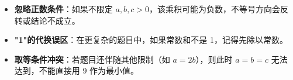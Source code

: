 \begin{trapbox}
\begin{itemize}
    \item \textbf{忽略正数条件}：如果不限定 $a,b,c > 0$，该乘积可能为负数，不等号方向会反转或结论不成立。
    \item \textbf{"1"的代换误区}：在更复杂的题目中，如果常数和不是 1，记得先除以常数。
    \item \textbf{取等条件冲突}：若题目还伴随其他限制（如 $a=2b$），则此时 $a=b=c$ 无法达到，不能直接用 9 作为最小值。
\end{itemize}
\end{trapbox}